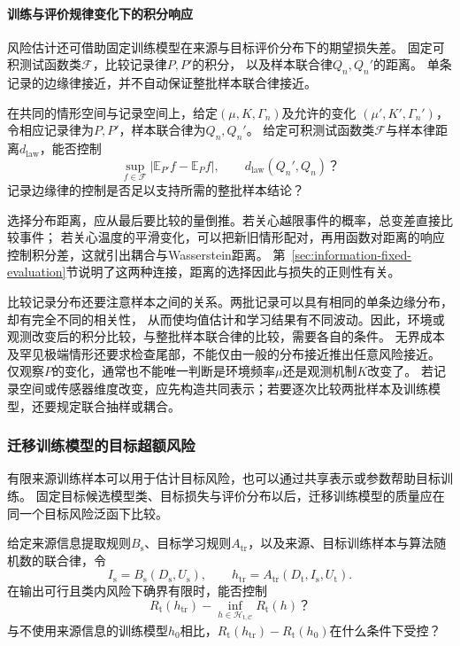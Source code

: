 \paragraph{训练与评价规律变化下的积分响应}
\label{sec:future-analysis-data-law-perturbation}

风险估计还可借助固定训练模型在来源与目标评价分布下的期望损失差。
固定可积测试函数类$\mathcal F$，比较记录律$P,P'$的积分，
以及样本联合律$Q_n,Q_n'$的距离。
单条记录的边缘律接近，并不自动保证整批样本联合律接近。

\begin{mathproblem}[观测规律与风险积分的扰动]
  \label{question:future-data-law-perturbation}
  在共同的情形空间与记录空间上，给定$(\mu,K,\Gamma_n)$及允许的变化
  $(\mu',K',\Gamma_n')$，令相应记录律为$P,P'$，样本联合律为$Q_n,Q_n'$。
  给定可积测试函数类$\mathcal F$与样本律距离$d_{\mathrm{law}}$，能否控制
  \[
    \sup_{f\in\mathcal F}|\mathbb E_{P'}f-\mathbb E_Pf|,
    \qquad d_{\mathrm{law}}(Q_n',Q_n)\text{？}
  \]
  记录边缘律的控制是否足以支持所需的整批样本结论？
\end{mathproblem}

选择分布距离，应从最后要比较的量倒推。若关心越限事件的概率，总变差直接比较事件；
若关心温度的平滑变化，可以把新旧情形配对，再用函数对距离的响应控制积分差，这就引出耦合与Wasserstein距离。
第~\ref{sec:information-fixed-evaluation}节说明了这两种连接，距离的选择因此与损失的正则性有关。

比较记录分布还要注意样本之间的关系。两批记录可以具有相同的单条边缘分布，却有完全不同的相关性，
从而使均值估计和学习结果有不同波动。因此，环境或观测改变后的积分比较，与整批样本联合律的比较，需要各自的条件。
无界成本及罕见极端情形还要求检查尾部，不能仅由一般的分布接近推出任意风险接近。
仅观察$P$的变化，通常也不能唯一判断是环境频率$\mu$还是观测机制$K$改变了。
若记录空间或传感器维度改变，应先构造共同表示；若要逐次比较两批样本及训练模型，还要规定联合抽样或耦合。

\subsubsection{迁移训练模型的目标超额风险}
\label{sec:future-analysis-transfer-excess-risk}

有限来源训练样本可以用于估计目标风险，也可以通过共享表示或参数帮助目标训练。
固定目标候选模型类、目标损失与评价分布以后，迁移训练模型的质量应在同一个目标风险泛函下比较。

\begin{mathproblem}[迁移训练模型与目标最佳候选的风险差]
  \label{question:future-transfer-excess-risk}
  给定来源信息提取规则$B_{\mathrm s}$、目标学习规则$A_{\mathrm{tr}}$，以及来源、目标训练样本与算法随机数的联合律，令
  \[
    I_{\mathrm s}=B_{\mathrm s}(D_{\mathrm s},U_{\mathrm s}),\qquad
    h_{\mathrm{tr}}=A_{\mathrm{tr}}(D_{\mathrm t},I_{\mathrm s},U_{\mathrm t}).
  \]
  在输出可行且类内风险下确界有限时，能否控制
  \[
    R_{\mathrm t}(h_{\mathrm{tr}})-\inf_{h\in\mathcal H_{\mathrm t,\mathcal C}}R_{\mathrm t}(h)\text{？}
  \]
  与不使用来源信息的训练模型$h_0$相比，$R_{\mathrm t}(h_{\mathrm{tr}})-R_{\mathrm t}(h_0)$在什么条件下受控？
\end{mathproblem}

